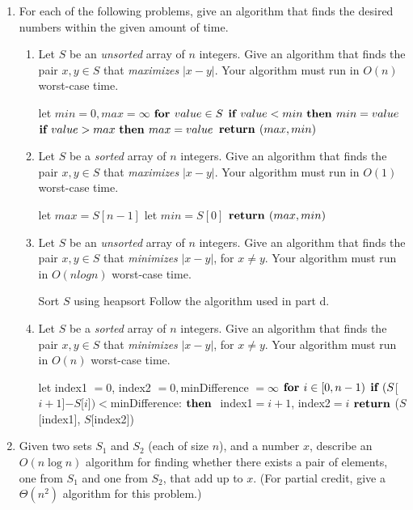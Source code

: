 \documentclass[12pt]{article}
\begin{document}
\begin{enumerate}
    \item For each of the following problems, give an algorithm that finds the desired
    numbers within the given amount of time.
    \begin{enumerate}
        \item Let $S$ be an \emph{unsorted} array of $n$ integers. Give an algorithm
        that finds the pair $x, y \in S$ that \emph{maximizes} $|x-y|$. Your algorithm must
        run in $O(n)$ worst-case time.

        \tabto{1cm}let $min = 0, max = \infty$
        \tabto{1cm}$\mbox{\bf for\ } value \in S$
        \tabto{2cm}$\mbox{\bf if\ } value < min\ \mbox{\bf then\ } min = value$
        \tabto{2cm}$\mbox{\bf if\ } value > max\ \mbox{\bf then\ } max = value$
        \tabto{1cm}$\mbox{\bf return\ } (max, min)$

        \item Let $S$ be a \emph{sorted} array of $n$ integers. Give an algorithm that finds the pair
        $x, y \in S$ that \emph{maximizes} $|x-y|$. Your algorithm must run in $O(1)$ worst-case time.

        \tabto{1cm}let $max = S[n-1]$
        \tabto{1cm}let $min = S[0]$
        \tabto{1cm}$\mbox{\bf return\ } (max, min)$

        \item  Let $S$ be an \emph{unsorted} array of $n$ integers. Give an algorithm that finds the pair
        $x, y \in S$ that \emph{minimizes} $|x-y|$, for $x\neq y$. Your algorithm must run in $O(n log n)$
        worst-case time.

        \tabto{1cm}Sort $S$ using heapsort
        \tabto{1cm}Follow the algorithm used in part d.

        \item Let $S$ be a \emph{sorted} array of $n$ integers. Give an algorithm that finds the pair
        $x, y \in S$ that \emph{minimizes} $|x-y|$, for $x \neq y$. Your algorithm must run in $O(n)$
        worst-case time.

        \tabto{1cm}let index1 $= 0$, index2 $= 0, $minDifference $= \infty$
        \tabto{1cm}$\mbox{\bf for\ } i \in [0,n-1)$
        \tabto{2cm}$\mbox{\bf if\ } (S$[$i+1$]$-S$[$i$]$)<$minDifference:
        \tabto{3cm}$\mbox{\bf then\ }$ index1$=i+1$, index2$=i$
        \tabto{1cm}$\mbox{\bf return\ } $($S$[index1], $S$[index2])
    \end{enumerate}
    \pagebreak
    \item Given two sets $S_1$ and $S_2$ (each of size $n$), and a number $x$, describe an $O(n \log n)$
    algorithm for finding whether there exists a pair of elements, one from $S_1$ and one
    from $S_2$, that add up to $x$. (For partial credit, give a $\Theta(n^2)$ algorithm for this
    problem.)


\end{enumerate}
\end{document}
